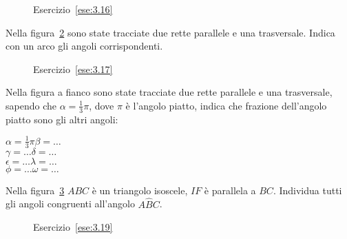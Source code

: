\begin{inaccessibleblock}
 \begin{figure}[htb]
\centering
\caption{Esercizio~\ref{ese:3.16}}\label{fig:ese3.16}
\end{figure}
\end{inaccessibleblock}

\begin{esercizio}
\label{ese:3.17}
Nella figura~\ref{fig:ese3.17} sono state tracciate due rette 
parallele e una trasversale. Indica con un arco gli angoli 
corrispondenti.
\end{esercizio}

\begin{inaccessibleblock}
 \begin{figure}[htb]
\centering
\caption{Esercizio~\ref{ese:3.17}}\label{fig:ese3.17}
\end{figure}
\end{inaccessibleblock}

\begin{esercizio}
\label{ese:3.18}
Nella figura a fianco sono state tracciate due rette parallele e una 
trasversale, sapendo che $\alpha=\frac{1}{3}\pi$, dove $\pi$ è 
l'angolo piatto, indica che frazione dell'angolo piatto sono gli 
altri angoli:\\
\noindent\begin{minipage}{.5\textwidth}
$\alpha=\frac{1}{3}\pi$\tab\tab $\beta = \ldots$\\
$\gamma=\ldots$\tab\tab $\delta = \ldots$\\
$\epsilon=\ldots$\tab\tab $\lambda = \ldots$\\
$\phi=\ldots$\tab\tab $\omega = \ldots$
\end{minipage}\hfil
\begin{minipage}{.5\textwidth}
\centering
\end{minipage}
\end{esercizio}

\begin{esercizio}
\label{ese:3.19}
Nella figura~\ref{fig:ese3.19} $ABC$ è un triangolo isoscele, $IF$ è 
parallela a $BC$. Individua tutti gli angoli congruenti all'angolo 
$A\widehat{B}C$.
\end{esercizio}

\begin{inaccessibleblock}
 \begin{figure}[htb]
\centering
\caption{Esercizio~\ref{ese:3.19}}\label{fig:ese3.19}
\end{figure}
\end{inaccessibleblock}

